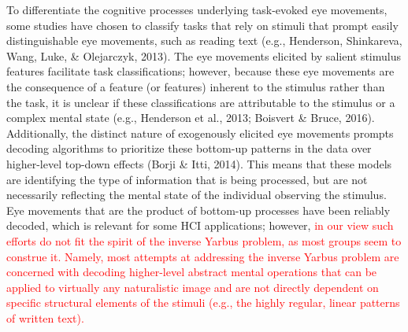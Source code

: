 \documentclass[
  english,
  man, donotrepeattitle,floatsintext]{apa6}
\begin{document}
To differentiate the cognitive processes underlying task-evoked eye movements, some studies have chosen to classify tasks that rely on stimuli that prompt easily distinguishable eye movements, such as reading text (e.g., Henderson, Shinkareva, Wang, Luke, \& Olejarczyk, 2013). The eye movements elicited by salient stimulus features facilitate task classifications; however, because these eye movements are the consequence of a feature (or features) inherent to the stimulus rather than the task, it is unclear if these classifications are attributable to the stimulus or a complex mental state (e.g., Henderson et al., 2013; Boisvert \& Bruce, 2016). Additionally, the distinct nature of exogenously elicited eye movements prompts decoding algorithms to prioritize these bottom-up patterns in the data over higher-level top-down effects (Borji \& Itti, 2014). This means that these models are identifying the type of information that is being processed, but are not necessarily reflecting the mental state of the individual observing the stimulus. Eye movements that are the product of bottom-up processes have been reliably decoded, which is relevant for some HCI applications; however, \textcolor{red}{ in our view such efforts do not fit the spirit of the inverse Yarbus problem, as most groups seem to construe it. Namely, most attempts at addressing the inverse Yarbus problem are concerned with decoding higher-level abstract mental operations that can be applied to virtually any naturalistic image and are not directly dependent on specific structural elements of the stimuli (e.g., the highly regular, linear patterns of written text).}
\end{document}
